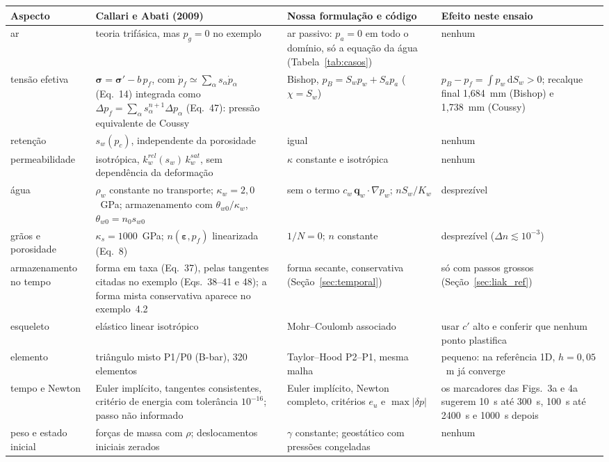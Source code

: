 \documentclass[11pt,a4paper]{article}
\newcommand{\vq}{\bm q}
\newcommand{\tsig}{\bm\sigma}
\newcommand{\teps}{\bm\varepsilon}
\newcommand{\dd}{\mathrm d}
\begin{document}
\begin{center}\small
\begin{tabularx}{\textwidth}{@{}>{\raggedright\arraybackslash}p{2.5cm}
                             >{\raggedright\arraybackslash}X
                             >{\raggedright\arraybackslash}X
                             >{\raggedright\arraybackslash}p{3.3cm}@{}}
\toprule
Aspecto & Callari e Abati (2009) & Nossa formulação e código & Efeito neste ensaio\\
\midrule
ar & teoria trifásica, mas $p_g=0$ no exemplo & ar passivo: $p_a=0$ em todo o domínio, só a equação da água (Tabela~\ref{tab:casos}) & nenhum\\
tensão efetiva & $\tsig=\tsig'-b\,p_f$, com $\dot p_f\simeq\sum_\alpha s_\alpha\dot p_\alpha$ (Eq.~14) integrada como $\Delta p_f=\sum_\alpha s_\alpha^{n+1}\Delta p_\alpha$ (Eq.~47): pressão equivalente de Coussy & Bishop, $p_B=S_wp_w+S_ap_a$ ($\chi=S_w$) & $p_B-p_f=\int p_w\,\dd S_w>0$; recalque final 1,684~mm (Bishop) e 1,738~mm (Coussy)\\
retenção & $s_w(p_c)$, independente da porosidade & igual & nenhum\\
permeabilidade & isotrópica, $k_w^{rel}(s_w)\,k_w^{sat}$, sem dependência da deformação & $\kappa$ constante e isotrópica & nenhum\\
água & $\rho_w$ constante no transporte; $\kappa_w=2{,}0$~GPa; armazenamento com $\theta_{w0}/\kappa_w$, $\theta_{w0}=n_0s_{w0}$ & sem o termo $c_w\,\vq_w\cdot\nabla p_w$; $nS_w/K_w$ & desprezível\\
grãos e porosidade & $\kappa_s=1000$~GPa; $n(\teps,p_f)$ linearizada (Eq.~8) & $1/N=0$; $n$ constante & desprezível ($\Delta n\lesssim10^{-3}$)\\
armazenamento no tempo & forma em taxa (Eq.~37), pelas tangentes citadas no exemplo (Eqs.~38--41 e 48); a forma mista conservativa aparece no exemplo~4.2 & forma secante, conservativa (Seção~\ref{sec:temporal}) & só com passos grossos (Seção~\ref{sec:liak_ref})\\
esqueleto & elástico linear isotrópico & Mohr--Coulomb associado & usar $c'$ alto e conferir que nenhum ponto plastifica\\
elemento & triângulo misto P1/P0 (B-bar), 320 elementos & Taylor--Hood P2--P1, mesma malha & pequeno: na referência 1D, $h=0{,}05$~m já converge\\
tempo e Newton & Euler implícito, tangentes consistentes, critério de energia com tolerância $10^{-16}$; passo não informado & Euler implícito, Newton completo, critérios $e_u$ e $\max|\delta p|$ & os marcadores das Figs.~3a e 4a sugerem 10~s até 300~s, 100~s até 2400~s e 1000~s depois\\
peso e estado inicial & forças de massa com $\rho$; deslocamentos iniciais zerados & $\gamma$ constante; geostático com pressões congeladas & nenhum\\
\bottomrule
\end{tabularx}
\end{center}
\end{document}
